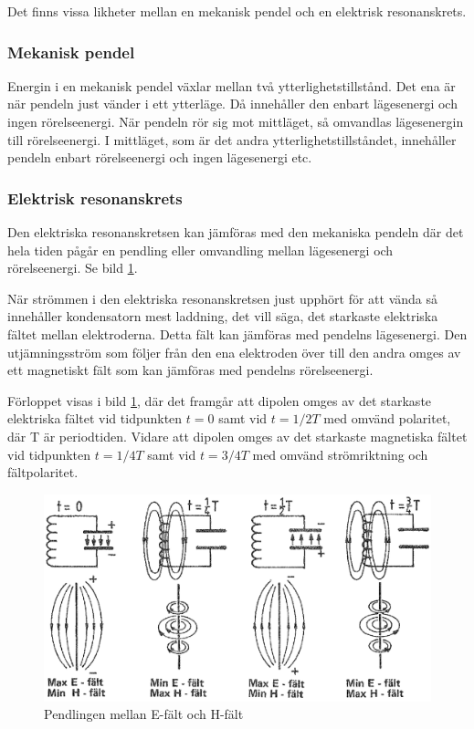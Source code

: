 Det finns vissa likheter mellan en mekanisk pendel och en elektrisk
resonanskrets.

\subsubsection{Mekanisk pendel}

Energin i en mekanisk pendel växlar mellan två ytterlighetstillstånd.
Det ena är när pendeln just vänder i ett ytterläge.
Då innehåller den enbart lägesenergi och ingen rörelseenergi.
När pendeln rör sig mot mittläget, så omvandlas lägesenergin till rörelseenergi.
I mittläget, som är det andra ytterlighetstillståndet, innehåller pendeln enbart
rörelseenergi och ingen lägesenergi etc.

\subsubsection{Elektrisk resonanskrets}

Den elektriska resonanskretsen kan jämföras med den mekaniska pendeln där det
hela tiden pågår en pendling eller omvandling mellan lägesenergi och
rörelseenergi.
Se bild \ref{fig:BildII7-02}.

När strömmen i den elektriska resonanskretsen just upphört för att vända så
innehåller kondensatorn mest laddning, det vill säga, det starkaste elektriska
fältet mellan elektroderna.
Detta fält kan jämföras med pendelns lägesenergi.
Den utjämningsström som följer från den ena elektroden över till den andra
omges av ett magnetiskt fält som kan jämföras med pendelns rörelseenergi.

Förloppet visas i bild \ref{fig:BildII7-02}, där det framgår att dipolen omges
av det starkaste elektriska fältet vid tidpunkten \(t=0\) samt vid
\(t=1/2T\) med omvänd polaritet, där T är periodtiden.
Vidare att dipolen omges av det starkaste magnetiska fältet vid tidpunkten
\(t=1/4T\) samt vid \(t=3/4T\) med omvänd strömriktning och fältpolaritet.

\begin{figure}
\includegraphics[width=\textwidth]{images/cropped_pdfs/bild_2_7-02.pdf}
\caption{Pendlingen mellan E-fält och H-fält}
\label{fig:BildII7-02}
\end{figure}

